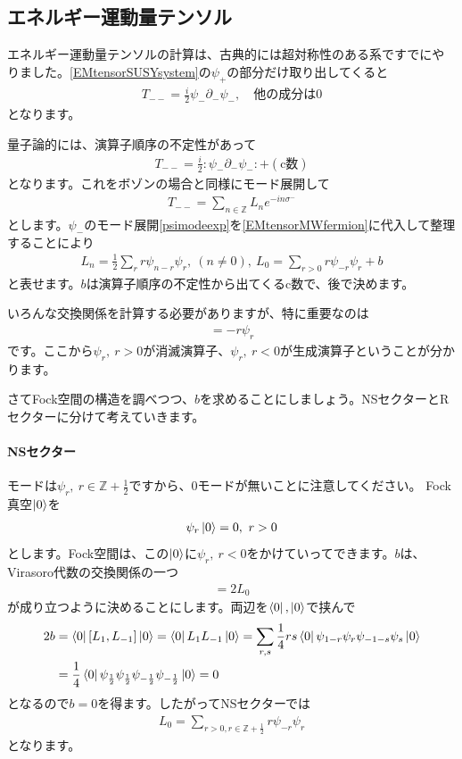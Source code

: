 \documentclass[report,paper=a4, fontsize=12pt, line_length=16cm, number_of_lines=34,dvipdfmx]{jlreq}
\numberwithin{equation}{chapter}
\numberwithin{equation}{section}
\newcommand{\Zb}{\mathbb{Z}}
\newcommand{\del}{\partial}
\begin{document}
\subsection{エネルギー運動量テンソル}
エネルギー運動量テンソルの計算は、古典的には超対称性のある系ですでにやりました。\eqref{EMtensorSUSYsystem}の$\psi_{+}$の部分だけ取り出してくると
\begin{align}
  T_{--}=\frac{i}{2} \psi_{-}\del_{-}\psi_{-},\quad \text{他の成分は0}
\end{align}
となります。

量子論的には、演算子順序の不定性があって
\begin{align}
  T_{--}=\frac{i}{2}:\psi_{-}\del_{-}\psi_{-}:+(\text{c数})\label{EMtensorMWfermion}
\end{align}
となります。これをボゾンの場合と同様にモード展開して
\begin{align}
  T_{--}=\sum_{n\in\Zb}L_{n}e^{-in\sigma^{-}}
\end{align}
とします。$\psi_{-}$のモード展開\eqref{psimodeexp}を\eqref{EMtensorMWfermion}に代入して整理することにより
\begin{align}
  L_{n}=\frac{1}{2}\sum_{r}r\psi_{n-r}\psi_{r},\ (n\ne 0),\ 
  L_0=\sum_{r>0}r\psi_{-r}\psi_{r}+b
\end{align}
と表せます。$b$は演算子順序の不定性から出てくるc数で、後で決めます。

いろんな交換関係を計算する必要がありますが、特に重要なのは
\begin{align}
  [L_0,\psi_r]=-r\psi_{r}
\end{align}
です。ここから$\psi_{r},\ r>0$が消滅演算子、$\psi_{r},\ r<0$が生成演算子ということが分かります。

さてFock空間の構造を調べつつ、$b$を求めることにしましょう。NSセクターとRセクターに分けて考えていきます。

\paragraph{NSセクター}
モードは$\psi_{r},\ r\in \Zb+\frac12$ですから、0モードが無いことに注意してください。
Fock真空$\ket{0}$を
\begin{align}
  \psi_{r}\ket{0}=0,\ r>0
\end{align}
とします。Fock空間は、この$\ket{0}$に$\psi_{r},\ r<0$をかけていってできます。$b$は、Virasoro代数の交換関係の一つ
\begin{align}
  [L_{1},L_{-1}]=2L_{0}
\end{align}
が成り立つように決めることにします。両辺を$\bra{0},\ket{0}$で挟んで
\begin{align}
  2b
  &=\bra{0}[L_{1},L_{-1}]\ket{0}
  =\bra{0}L_{1}L_{-1}\ket{0}
  =\sum_{r,s}\frac14rs\bra{0}\psi_{1-r}\psi_{r}\psi_{-1-s}\psi_{s}\ket{0}\nonumber\\
  &=\frac14 \bra{0}\psi_{\frac12}\psi_{\frac12}\psi_{-\frac12}\psi_{-\frac12}\ket{0}=0
\end{align}
となるので$b=0$を得ます。したがってNSセクターでは
\begin{align}
  L_0=\sum_{r>0,r\in \Zb+\frac12} r\psi_{-r}\psi_{r}
\end{align}
となります。
\end{document}
